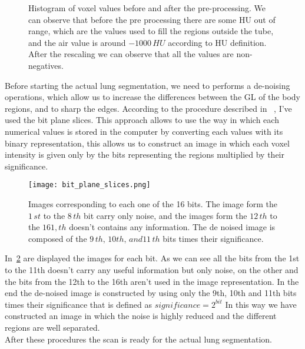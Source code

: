 \documentclass{standalone}
\begin{document}
	\begin{figure}[h]
		\centering
		\label{fig:Pre-Processing}\caption{Histogram of voxel values before and after the pre-processing. We can observe that before the pre processing there are some HU out of range, which are the values used to fill the regions outside the tube, and the air value is around $-1000\,HU$ according to HU definition. After the rescaling we can observe that all the values are non-negatives.}
	\end{figure}
	
	
	
	Before starting the actual lung segmentation, we need to performs a de-noising operations, which allow us to increase the differences between the GL of the body regions, and to sharp the edges. According to the procedure described in ~\cite{ART:Abdullah}, I've used the bit plane slices. This approach allows to use the way in which each numerical values is stored in the computer by converting  each values with its binary representation, this allows us to construct an image in which each voxel intensity is given only by the bits representing the regions multiplied by their significance.
	
	\begin{figure}[h]
		\centering
			\texttt{[image: bit\_plane\_slices.png]}
		\label{fig:BinaryRepr}\caption{Images corresponding to each one of the 16 bits. The image form the $1\,st$ to the $8\,th $ bit carry only noise, and the images form the $12\,th$ to the $161,th$ doesn't  contains any information. The de noised image is composed of the $9\,th,\,10th,\,and 11\,th$ bits times their significance. }
	\end{figure}

	In \figurename\,\ref{fig:BinaryRepr} are displayed the images for each bit. As we can see all the bits from the 1st to the 11th doesn't carry any useful information but only noise, on the other and the bits from the 12th to the 16th aren't used in the image representation. In the end the de-noised image is constructed by using only the 9th, 10th and 11th bits times their significance that is defined as $significance = 2^{bit}$
	In this way we have constructed an image in which the noise is highly reduced and the different regions are well separated.\\
	After these procedures the scan is ready for the actual lung segmentation.
	
\end{document}
